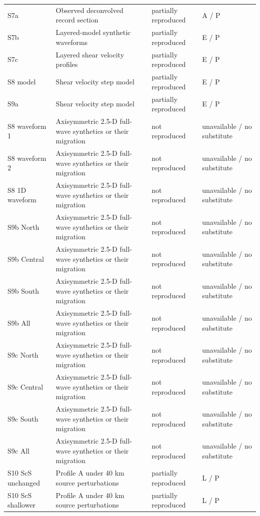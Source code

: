 \documentclass[10pt]{article}
\begin{document}
\begin{longtable}{p{.23\linewidth}p{.25\linewidth}p{.19\linewidth}p{.22\linewidth}}
S7a & Observed deconvolved record section & partially reproduced & A / P \\
S7b & Layered-model synthetic waveforms & partially reproduced & E / P \\
S7c & Layered shear velocity profiles & partially reproduced & E / P \\
S8 model & Shear velocity step model & partially reproduced & E / P \\
S9a & Shear velocity step model & partially reproduced & E / P \\
S8 waveform 1 & Axisymmetric 2.5-D full-wave synthetics or their migration & not reproduced & unavailable / no substitute \\
S8 waveform 2 & Axisymmetric 2.5-D full-wave synthetics or their migration & not reproduced & unavailable / no substitute \\
S8 1D waveform & Axisymmetric 2.5-D full-wave synthetics or their migration & not reproduced & unavailable / no substitute \\
S9b North & Axisymmetric 2.5-D full-wave synthetics or their migration & not reproduced & unavailable / no substitute \\
S9b Central & Axisymmetric 2.5-D full-wave synthetics or their migration & not reproduced & unavailable / no substitute \\
S9b South & Axisymmetric 2.5-D full-wave synthetics or their migration & not reproduced & unavailable / no substitute \\
S9b All & Axisymmetric 2.5-D full-wave synthetics or their migration & not reproduced & unavailable / no substitute \\
S9c North & Axisymmetric 2.5-D full-wave synthetics or their migration & not reproduced & unavailable / no substitute \\
S9c Central & Axisymmetric 2.5-D full-wave synthetics or their migration & not reproduced & unavailable / no substitute \\
S9c South & Axisymmetric 2.5-D full-wave synthetics or their migration & not reproduced & unavailable / no substitute \\
S9c All & Axisymmetric 2.5-D full-wave synthetics or their migration & not reproduced & unavailable / no substitute \\
S10 ScS unchanged & Profile A under 40 km source perturbations & partially reproduced & L / P \\
S10 ScS shallower & Profile A under 40 km source perturbations & partially reproduced & L / P \\

\end{longtable}
\end{document}
